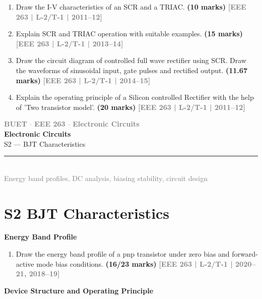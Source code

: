 \documentclass[12pt,a4paper]{article}
\newcommand{\yr}[1]{\hfill\textcolor{gray}{\small\textbf{[#1]}}}
\newcommand{\mk}[1]{\textcolor{orange!70!black}{\small\textbf{(#1 marks)}}}
\newcommand{\subtopic}[2]{%
  \vspace{10pt}
  \noindent\begin{tcolorbox}[colback=#1!8,colframe=#1,boxrule=0.6pt,arc=4pt,
    left=6pt,right=6pt,top=4pt,bottom=4pt]
    \small\bfseries\textcolor{#1}{#2}
  \end{tcolorbox}
  \vspace{2pt}
}
\newcommand{\secdivider}[3]{%
  \newpage\thispagestyle{empty}%
  \vspace*{\fill}%
  \begin{tcolorbox}[enhanced,colback=#3!6,colframe=#3,boxrule=1.5pt,arc=8pt,
    left=20pt,right=20pt,top=22pt,bottom=22pt,
    shadow={3pt}{-3pt}{0pt}{black!15}]
    \centering
    {\large\textcolor{gray}{\textbf{BUET $\cdot$ EEE 263 $\cdot$ Electronic Circuits}}}\\[8pt]
    {\fontsize{26}{32}\selectfont\bfseries\textcolor{#3}{Electronic Circuits}}\\[6pt]
    {\fontsize{15}{19}\selectfont\textcolor{dgray}{#1}}\\[12pt]
    \textcolor{#3!60}{\rule{0.5\textwidth}{0.5pt}}\\[6pt]
    {\small\textcolor{gray}{#2}}
  \end{tcolorbox}%
  \vspace*{\fill}\newpage%
}
\begin{document}
\begin{enumerate}
\mk{20} \yr{EEE 263 | L-2/T-1 | 2011--12}


\item Draw the I-V characteristics of an SCR and a TRIAC.
\mk{10} \yr{EEE 263 | L-2/T-1 | 2011--12}

\item Explain SCR and TRIAC operation with suitable examples.
\mk{15} \yr{EEE 263 | L-2/T-1 | 2013--14}

\item  Draw the circuit diagram of controlled full wave rectifier using SCR. Draw the waveforms of sinusoidal input, gate pulses and rectified output.
\mk{11.67} \yr{EEE 263 | L-2/T-1 | 2014--15}

\item Explain the operating principle of a Silicon controlled Rectifier with the help of 'Two transistor model'.
\mk{20} \yr{EEE 263 | L-2/T-1 | 2011--12}



\end{enumerate}


\secdivider{S2 --- BJT Characteristics}{Energy band profiles, DC analysis, biasing stability, circuit design}{cA}

\label{sec:S2}
\section*{S2 \quad BJT Characteristics}

\subtopic{cA}{Energy Band Profile}
\label{sub:s2-energy}

\begin{enumerate}

\item Draw the energy band profile of a pnp transistor under zero bias and forward-active mode bias conditions.
\mk{16/23} \yr{EEE 263 | L-2/T-1 | 2020--21, 2018--19}

\end{enumerate}

\subtopic{cA}{Device Structure and Operating Principle}
\label{sub:s2-structure}
\end{document}
